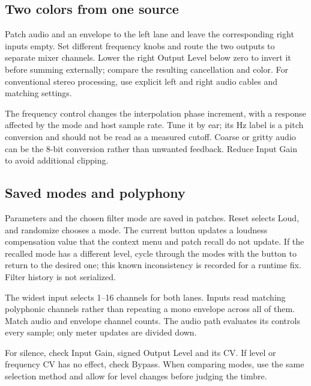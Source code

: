 \subsection{Two colors from one source}
Patch audio and an envelope to the left lane and leave the corresponding
right inputs empty. Set different frequency knobs and route the two outputs
to separate mixer channels. Lower the right Output Level below zero to invert
it before summing externally; compare the resulting cancellation and color.
For conventional stereo processing, use explicit left and right audio cables
and matching settings.

The frequency control changes the interpolation phase increment, with a
response affected by the mode and host sample rate. Tune it by ear; its Hz
label is a pitch conversion and should not be read as a measured cutoff.
Coarse or gritty audio can be the 8-bit conversion rather than unwanted
feedback. Reduce Input Gain to avoid additional clipping.

\subsection{Saved modes and polyphony}
Parameters and the chosen filter mode are saved in patches. Reset selects
Loud, and randomize chooses a mode. The current button updates a loudness
compensation value that the context menu and patch recall do not update.
If the recalled mode has a different level, cycle through the modes with the
button to return to the desired one; this known inconsistency is recorded
for a runtime fix. Filter history is not serialized.

The widest input selects 1--16 channels for both lanes. Inputs read matching
polyphonic channels rather than repeating a mono envelope across all of them.
Match audio and envelope channel counts. The audio path evaluates its controls
every sample; only meter updates are divided down.

For silence, check Input Gain, signed Output Level and its CV. If level or
frequency CV has no effect, check Bypass. When comparing modes, use the same
selection method and allow for level changes before judging the timbre.
